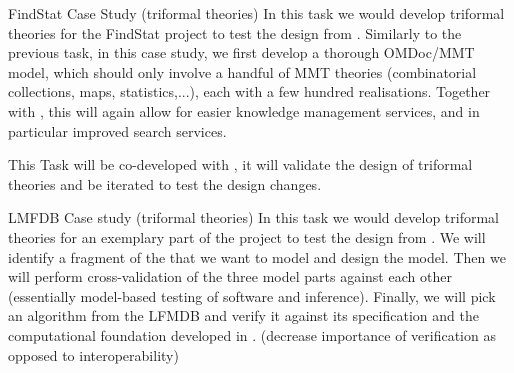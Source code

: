 \begin{Workpackage}{\thewpno}

\begin{task}{FindStat Case Study (triformal theories)}
\label{task:data_findstat}
In this task we would develop triformal theories for the FindStat project to test the design from .  
Similarly to the previous task, in this case study, we first develop a thorough OMDoc/MMT model, which should only involve a handful of MMT theories (combinatorial collections, maps, statistics,...), each with a few hundred realisations. Together with , this will again allow for easier knowledge management services, and in particular improved search services. 

This Task will be co-developed with , it will validate the design of triformal theories and be iterated to test the design changes.
\end{task}

\begin{task}{LMFDB Case study (triformal theories)}
\label{task:data_LMFDB}
In this task we would develop triformal theories for an exemplary part of the \LMFDB project to test the design from .  
We will identify a fragment of the \LFMDB that we want to model and design the model. Then we will perform cross-validation of the three model parts against each other (essentially model-based testing of software and inference). Finally, we will pick an algorithm from the LFMDB and verify it against its specification and the computational foundation developed in . (decrease importance of verification as opposed to interoperability)
\end{task}




\end{Workpackage}
